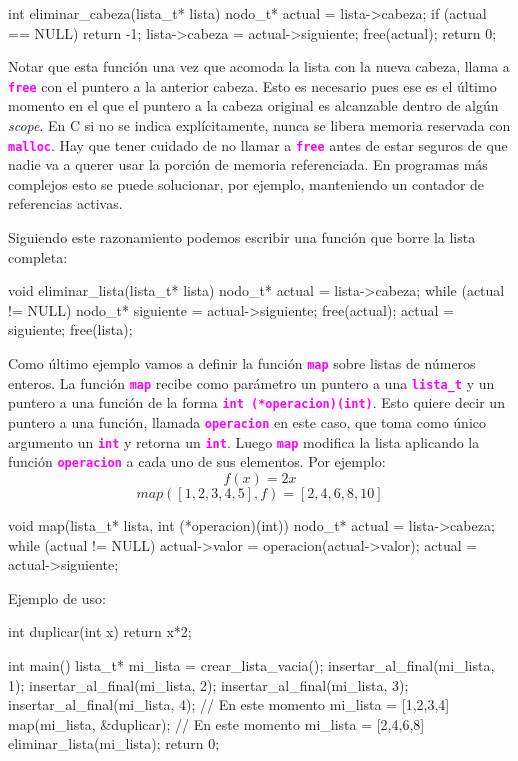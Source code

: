 \documentclass[]{scrartcl}
\newcommand{\hl}[1]{\textcolor{magenta}{\textbf{\texttt{#1}}}}
\begin{document}
\begin{cbox}[unbreakable]{}
int eliminar_cabeza(lista_t* lista) {
    nodo_t* actual = lista->cabeza;
    if (actual == NULL)
        return -1;
    lista->cabeza = actual->siguiente;
    free(actual);
    return 0;
}
\end{cbox}

Notar que esta función una vez que acomoda la lista con la nueva cabeza, llama a \hl{free} con el puntero a la anterior cabeza. Esto es necesario pues ese es el último momento en el que el puntero a la cabeza original es alcanzable dentro de algún \textit{scope}. En C si no se indica explícitamente, nunca se libera memoria reservada con \hl{malloc}. Hay que tener cuidado de no llamar a \hl{free} antes de estar seguros de que nadie va a querer usar la porción de memoria referenciada. En programas más complejos esto se puede solucionar, por ejemplo, manteniendo un contador de referencias activas.

Siguiendo este razonamiento podemos escribir una función que borre la lista completa:
\begin{cbox}[unbreakable]{}
void eliminar_lista(lista_t* lista) {
    nodo_t* actual = lista->cabeza;
    while (actual != NULL) {
        nodo_t* siguiente = actual->siguiente;
        free(actual);
        actual = siguiente;
    }
    free(lista);
}
\end{cbox}

Como último ejemplo vamos a definir la función \hl{map} sobre listas de números enteros. La función \hl{map} recibe como parámetro un puntero a una \hl{lista\_t} y un puntero a una función de la forma \hl{int (*operacion)(int)}. Esto quiere decir un puntero a una función, llamada \hl{operacion} en este caso, que toma como único argumento un \hl{int} y retorna un \hl{int}. Luego \hl{map} modifica la lista aplicando la función \hl{operacion} a cada uno de sus elementos. 
Por ejemplo:
$$
f(x) = 2x
$$
$$
map([1,2,3,4,5], f) = [2,4,6,8,10]
$$

\newpage %

\begin{cbox}[unbreakable]{}
void map(lista_t* lista, int (*operacion)(int)) {
    nodo_t* actual = lista->cabeza;
    while (actual != NULL) {
        actual->valor = operacion(actual->valor);
        actual = actual->siguiente;
    }
}
\end{cbox}

Ejemplo de uso:

\begin{cbox}[unbreakable]{}
int duplicar(int x) {
    return x*2;
}

int main() {
    lista_t* mi_lista = crear_lista_vacia();
    insertar_al_final(mi_lista, 1);
    insertar_al_final(mi_lista, 2);
    insertar_al_final(mi_lista, 3);
    insertar_al_final(mi_lista, 4);
    // En este momento mi_lista = [1,2,3,4]
    map(mi_lista, &duplicar);
    // En este momento mi_lista = [2,4,6,8]
    eliminar_lista(mi_lista);
    return 0;
}
\end{cbox}
\end{document}
